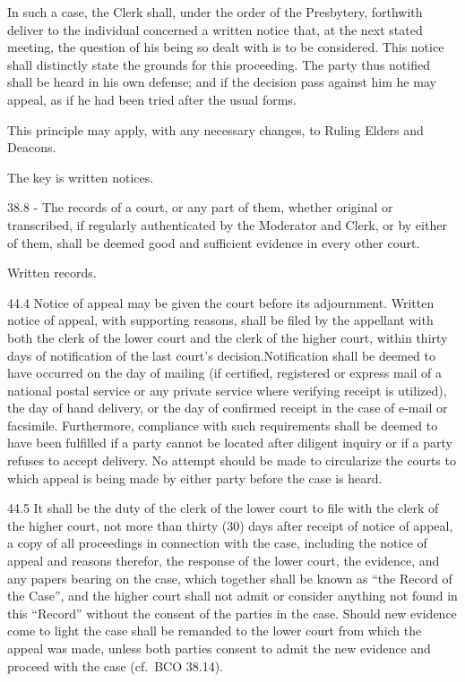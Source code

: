 \documentclass[
]{book}
\begin{document}
In such a case, the Clerk shall, under the order of the Presbytery, forthwith deliver to the individual concerned a written notice that, at the next stated meeting, the question of his being so dealt with is to be considered. This notice shall distinctly state the grounds for this proceeding. The party thus notified shall be heard in his own defense; and if the decision pass against him he may appeal, as if he had been tried after the usual forms.

This principle may apply, with any necessary changes, to Ruling Elders and Deacons.

The key is written notices.

38.8 - The records of a court, or any part of them, whether original or transcribed, if regularly authenticated by the Moderator and Clerk, or by either of them, shall be deemed good and sufficient evidence in every other court.

Written records.

44.4 Notice of appeal may be given the court before its adjournment. Written notice of appeal, with supporting reasons, shall be filed by the appellant with both the clerk of the lower court and the clerk of the higher court, within thirty days of notification of the last court's decision.Notification shall be deemed to have occurred on the day of mailing (if certified, registered or express mail of a national postal service or any private service where verifying receipt is utilized), the day of hand delivery, or the day of confirmed receipt in the case of e-mail or facsimile. Furthermore, compliance with such requirements shall be deemed to have been fulfilled if a party cannot be located after diligent inquiry or if a party refuses to accept delivery. No attempt should be made to circularize the courts to which appeal is being made by either party before the case is heard.

44.5 It shall be the duty of the clerk of the lower court to file with the clerk of the higher court, not more than thirty (30) days after receipt of notice of appeal, a copy of all proceedings in connection with the case, including the notice of appeal and reasons therefor, the response of the lower court, the evidence, and any papers bearing on the case, which together shall be known as ``the Record of the Case'', and the higher court shall not admit or consider anything not found in this ``Record'' without the consent of the parties in the case. Should new evidence come to light the case shall be remanded to the lower court from which the appeal was made, unless both parties consent to admit the new evidence and proceed with the case (cf.~BCO 38.14).
\end{document}

